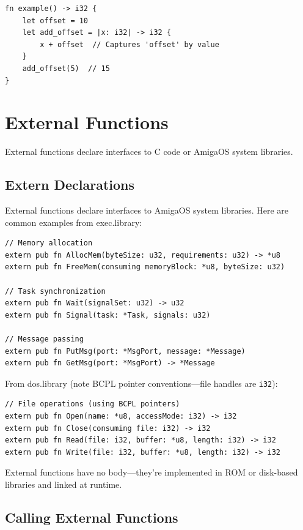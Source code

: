 \begin{lstlisting}
fn example() -> i32 {
    let offset = 10
    let add_offset = |x: i32| -> i32 {
        x + offset  // Captures 'offset' by value
    }
    add_offset(5)  // 15
}
\end{lstlisting}

\section{External Functions}
\label{sec:extern-fn}

External functions declare interfaces to C code or AmigaOS system libraries.

\subsection{Extern Declarations}
\label{subsec:extern-decl}

External functions declare interfaces to AmigaOS system libraries. Here are common examples from exec.library:

\begin{lstlisting}
// Memory allocation
extern pub fn AllocMem(byteSize: u32, requirements: u32) -> *u8
extern pub fn FreeMem(consuming memoryBlock: *u8, byteSize: u32)

// Task synchronization
extern pub fn Wait(signalSet: u32) -> u32
extern pub fn Signal(task: *Task, signals: u32)

// Message passing
extern pub fn PutMsg(port: *MsgPort, message: *Message)
extern pub fn GetMsg(port: *MsgPort) -> *Message
\end{lstlisting}

From dos.library (note BCPL pointer conventions---file handles are \texttt{i32}):

\begin{lstlisting}
// File operations (using BCPL pointers)
extern pub fn Open(name: *u8, accessMode: i32) -> i32
extern pub fn Close(consuming file: i32) -> i32
extern pub fn Read(file: i32, buffer: *u8, length: i32) -> i32
extern pub fn Write(file: i32, buffer: *u8, length: i32) -> i32
\end{lstlisting}

External functions have no body---they're implemented in ROM or disk-based libraries and linked at runtime.

\subsection{Calling External Functions}
\label{subsec:calling-extern}

